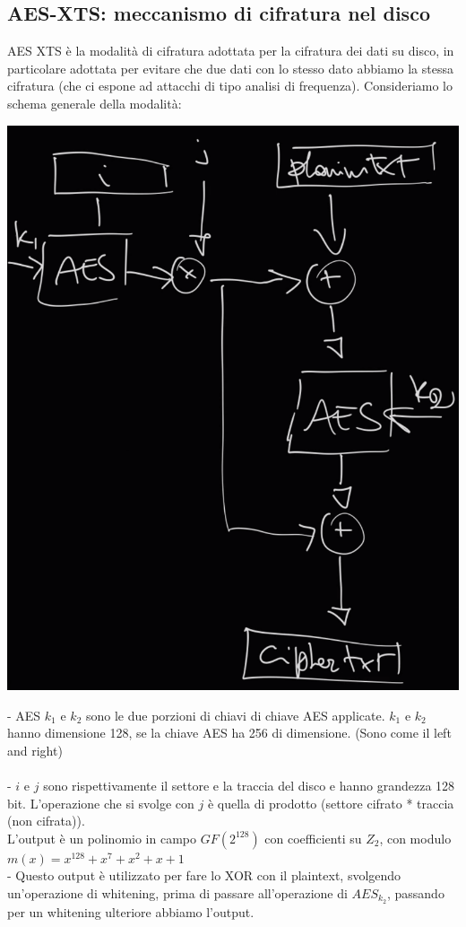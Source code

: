 \documentclass[11pt, oneside]{article}   	%
\begin{document}
\subsection*{AES-XTS: meccanismo di cifratura nel disco}
AES XTS è la modalità di cifratura adottata per la cifratura dei dati su disco, in particolare adottata per evitare che due dati con lo stesso dato abbiamo la stessa cifratura (che ci espone ad attacchi di tipo analisi di frequenza). Consideriamo lo schema generale della modalità:
\begin{center}
\includegraphics[scale= 0.4]{aesxts}
\end{center}
- AES $k_1$ e $k_2$ sono le due porzioni di chiavi di chiave AES applicate. $k_1$ e $k_2$ hanno dimensione 128, se la chiave AES ha 256 di dimensione. (Sono come il left and right)\\\\
- $i$ e $j$ sono rispettivamente il settore e la traccia del disco e hanno grandezza 128 bit. L'operazione che si svolge con $j$ è quella di prodotto (settore cifrato * traccia (non cifrata)). \\L'output è un polinomio in campo $GF(2^{128})$ con coefficienti su $Z_2$, con modulo $m(x) = x^{128}+x^7+x^2+x+1$\\
- Questo output è utilizzato per fare lo XOR con il plaintext, svolgendo un'operazione di whitening, prima di passare all'operazione di $AES_{k_2}$, passando per un whitening ulteriore abbiamo l'output.\\\\
\end{document}
